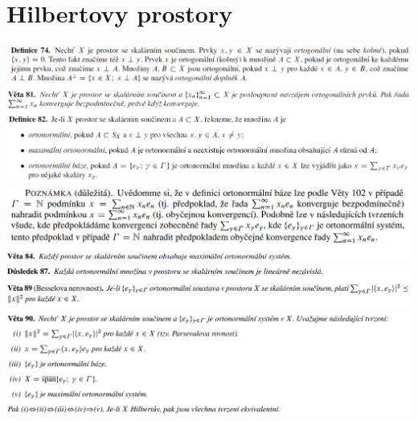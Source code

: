 \documentclass[12pt,a4paper]{article}
\begin{document}
\section{Hilbertovy prostory}
	\begin{center}
		\includegraphics[width=\textwidth]{img/3hilp/2020-06-21 13 01 41.png}\vspace{0.3cm}
		\includegraphics[width=\textwidth]{img/3hilp/2020-06-21 13 02 43.png}\vspace{0.3cm}
		\includegraphics[width=\textwidth]{img/3hilp/2020-06-21 13 02 55.png}\vspace{0.3cm}
		\includegraphics[width=\textwidth]{img/3hilp/2020-06-21 13 04 44.png}\vspace{0.3cm}
		\includegraphics[width=\textwidth]{img/3hilp/Image 009.png}\vspace{0.3cm}
		\includegraphics[width=\textwidth]{img/3hilp/Image 010.png}\vspace{0.3cm}
		\includegraphics[width=\textwidth]{img/3hilp/Image 011.png}\vspace{0.3cm}
		\includegraphics[width=\textwidth]{img/3hilp/Image 012.png}\vspace{0.3cm}

\end{center}
\end{document}
